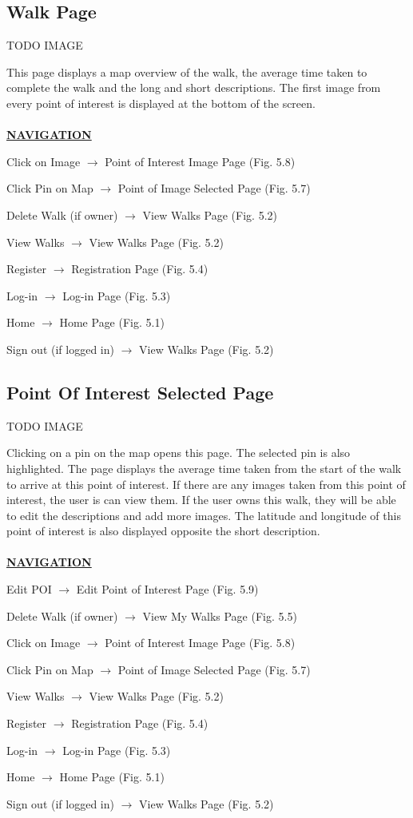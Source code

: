 \documentclass[12pt]{article}
\begin{document}
\subsection{Walk Page}
\par{TODO IMAGE}
\par{This page displays a map overview of the walk, the average time taken to complete the walk and the long and short descriptions. The first image from every point of interest is displayed at the bottom of the screen. \\ \\}
\textbf{\uline{NAVIGATION}}
\par{Click on Image $\rightarrow$ Point of Interest Image Page (Fig. 5.8)}
\par{Click Pin on Map $\rightarrow$ Point of Image Selected Page (Fig. 5.7)}
\par{Delete Walk (if owner) $\rightarrow$ View Walks Page (Fig. 5.2)}
\par{View Walks $\rightarrow$ View Walks Page (Fig. 5.2)}
\par{Register $\rightarrow$ Registration Page (Fig. 5.4)}
\par{Log-in $\rightarrow$ Log-in Page (Fig. 5.3)}
\par{Home $\rightarrow$ Home Page (Fig. 5.1)}
\par{Sign out (if logged in) $\rightarrow$ View Walks Page (Fig. 5.2)}
\subsection{Point Of Interest Selected Page}
\par{TODO IMAGE}
\par{Clicking on a pin on the map opens this page. The selected pin is also highlighted. The page displays the average time taken from the start of the walk to arrive at this point of interest. If there are any images taken from this point of interest, the user is can view them. If the user owns this walk, they will be able to edit the descriptions and add more images. The latitude and longitude of this point of interest is also displayed opposite the short description. \\ \\}
\textbf{\uline{NAVIGATION}}
\par{Edit POI $\rightarrow$ Edit Point of Interest Page (Fig. 5.9)}
\par{Delete Walk (if owner) $\rightarrow$ View My Walks Page (Fig. 5.5)}
\par{Click on Image $\rightarrow$ Point of Interest Image Page (Fig. 5.8)}
\par{Click Pin on Map $\rightarrow$ Point of Image Selected Page (Fig. 5.7)}
\par{View Walks $\rightarrow$ View Walks Page (Fig. 5.2)}
\par{Register $\rightarrow$ Registration Page (Fig. 5.4)}
\par{Log-in $\rightarrow$ Log-in Page (Fig. 5.3)}
\par{Home $\rightarrow$ Home Page (Fig. 5.1)}
\par{Sign out (if logged in) $\rightarrow$ View Walks Page (Fig. 5.2)}
\end{document}
